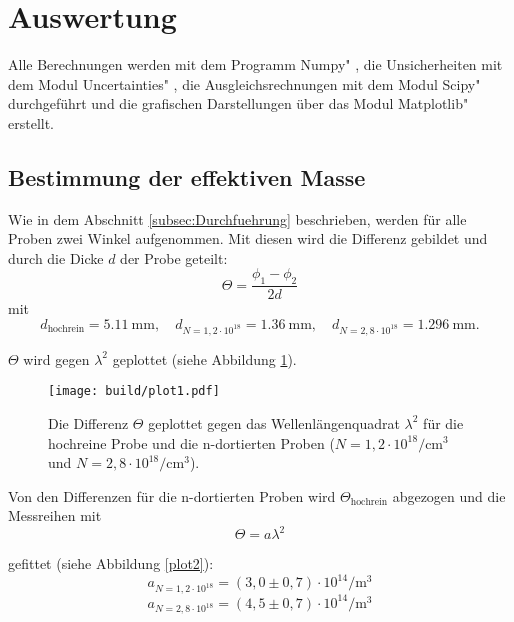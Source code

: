 \section{Auswertung}
\label{sec:Auswertung}
Alle Berechnungen werden mit dem Programm \glqq Numpy" \cite{numpy}, die Unsicherheiten mit dem Modul \glqq Uncertainties" \cite{uncertainties}, die Ausgleichsrechnungen mit dem Modul \glqq Scipy" \cite{scipy} durchgeführt und die grafischen Darstellungen über das Modul \glqq Matplotlib" \cite{matplotlib} erstellt.
\subsection{Bestimmung der effektiven Masse}
\noindent Wie in dem Abschnitt \ref{subsec:Durchfuehrung} beschrieben,
werden für alle Proben zwei Winkel aufgenommen.
Mit diesen wird die Differenz gebildet 
und durch die Dicke $d$ der Probe geteilt:
\begin{equation*}
    \Theta = \frac{\phi_1 - \phi_2}{2 d}
\end{equation*}
\noindent mit
\begin{equation*}
    d_\text{hochrein} = \qty{5.11}{\mm} ,
    \quad  d_{N=1,2 \cdot 10^{18}}= \qty{1.36}{\mm},
    \quad   d_{N=2,8 \cdot 10^{18}}= \qty{1.296}{\mm}.
\end{equation*}

\noindent $\Theta$ wird gegen $\lambda^2$ geplottet (siehe Abbildung \ref{plot1}).
\begin{figure}
    \texttt{[image: build/plot1.pdf]}
    \caption{Die Differenz $\Theta$ geplottet gegen das Wellenlängenquadrat $\lambda^2$
    für die hochreine Probe und die n-dortierten Proben 
    ($N = 1,2 \cdot 10^{18} \si{\per\cubic\cm}$ und $N = 2,8 \cdot 10^{18} \si{\per\cubic\cm}$).}
    \label{plot1}
\end{figure}

\FloatBarrier
\noindent Von den Differenzen für die n-dortierten Proben wird $\Theta_\text{hochrein}$ abgezogen
und die Messreihen mit 
\begin{equation}
    \label{ausgleich}
    \Theta = a \lambda^2
\end{equation}

\noindent gefittet (siehe Abbildung \ref{plot2}):
\begin{equation*}
    a_{N=1,2 \cdot 10^{18}} = (3,0 \pm 0,7)\cdot 10^{14} \si{\per\cubic\meter}
\end{equation*}
\begin{equation*}
    a_{N=2,8 \cdot 10^{18}} = (4,5 \pm 0,7)\cdot 10^{14} \si{\per\cubic\meter}
\end{equation*}
\FloatBarrier

